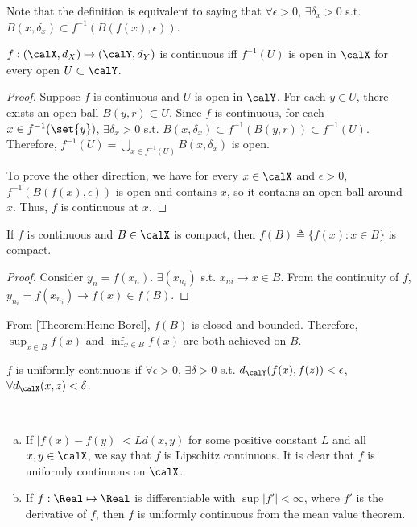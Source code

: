 \documentclass[../aipt.tex]{subfiles}
\begin{document}
Note that the definition is equivalent to saying that $\forall \epsilon>0$, $\exists \delta_x>0$ s.t. $B(x,\delta_x) \subset f^{-1}(B(f(x),\epsilon))$. 

\begin{Lemma}
$f: (\calX, d_X) \mapsto (\calY, d_Y)$ is continuous iff $f^{-1}(U)$ is open in $\calX$ for every open $U \subset \calY$.
\end{Lemma}
\begin{proof}
Suppose $f$ is continuous and $U$ is open in $\calY$. For each $y\in U$, there exists an open ball $B(y,r) \subset U$. Since $f$ is continuous, for each $x \in f^{-1}(\set{y})$, $\exists \delta_x>0$ s.t. $B(x,\delta_x) \subset f^{-1}(B(y,r)) \subset f^{-1}(U)$. Therefore, $f^{-1}(U) = \bigcup_{x\in f^{-1}(U)} B(x,\delta_x)$ is open. 

To prove the other direction, we have for every $x\in\calX$ and $\epsilon>0$, $f^{-1}(B(f(x),\epsilon))$ is open and contains $x$, so it contains an open ball around $x$. Thus, $f$ is continuous at $x$. 
\end{proof}

\begin{Lemma}
If $f$ is continuous and $B\in \calX$ is compact, then $f(B)\triangleq\{f(x): x \in B\}$ is compact.
\end{Lemma}
\begin{proof}
Consider $y_n= f(x_n)$. $\exists (x_{n_i})$ s.t. $x_{ni}\to x \in B$. From the continuity of $f$, $y_{n_i}=f(x_{n_i}) \to f(x) \in f(B)$. 
\end{proof}

From \cref{Theorem:Heine-Borel}, $f(B)$ is closed and bounded. Therefore, $\sup_{x\in B} f(x)$ and $\inf_{x\in B} f(x)$ are both achieved on $B$.

\begin{Definition}
$f$ is uniformly continuous if $\forall \epsilon>0$, $\exists \delta>0$ s.t. $d_{\calY}(f(x),f(z))<\epsilon$, $\forall d_{\calX}(x,z)<\delta$.
\end{Definition}

\begin{Example}\
\begin{enumerate}[(a)]
	\item If $|f(x)-f(y)| < L d(x,y)$ for some positive constant $L$ and all $x,y \in \calX$, we say that $f$ is Lipschitz continuous. It is clear that $f$ is uniformly continuous on $\calX$. 
	\item If $f : \Real\mapsto\Real$ is differentiable with $\sup |f'| <\infty$, where $f'$ is the derivative of $f$, then $f$ is uniformly continuous from the mean value theorem.
\end{enumerate}
\end{Example}
\end{document}
